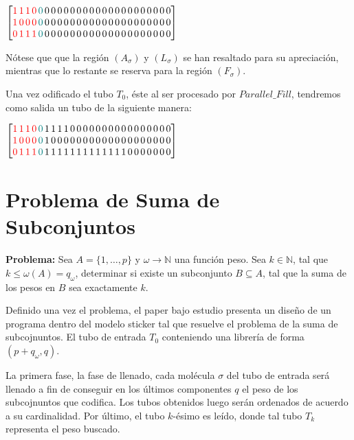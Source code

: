 \documentclass[12pt, letterpaper, twoside]{article}
\begin{document}
        $
            \begin{bmatrix}
                \textcolor{red}{1\,1\,1\,0}\textcolor{teal}{\,0}\,0\,0\,0\,0\,0\,0\,0\,0\,0\,0\,0\,0\,0\,0\,0\,0\,0\,0\,0\,0\\
                \textcolor{red}{1\,0\,0\,0}\textcolor{teal}{\,0}\,0\,0\,0\,0\,0\,0\,0\,0\,0\,0\,0\,0\,0\,0\,0\,0\,0\,0\,0\,0 \\
                \textcolor{red}{0\,1\,1\,1}\textcolor{teal}{\,0}\,0\,0\,0\,0\,0\,0\,0\,0\,0\,0\,0\,0\,0\,0\,0\,0\,0\,0\,0\,0
            \end{bmatrix}
        $


Nótese que que la región $(A_\sigma)$ y $(L_\sigma)$ se han resaltado para su apreciación, mientras que lo restante se reserva para la región $(F_\sigma)$.


Una vez odificado el tubo $T_0$, éste al ser procesado por $Parallel\_Fill$, tendremos como salida un tubo de la siguiente manera:


    $
        \begin{bmatrix}
            \textcolor{red}{1\,1\,1\,0}\textcolor{teal}{\,0}\,1\,1\,1\,1\,0\,0\,0\,0\,0\,0\,0\,0\,0\,0\,0\,0\,0\,0\,0\,0\\
            \textcolor{red}{1\,0\,0\,0}\textcolor{teal}{\,0}\,1\,0\,0\,0\,0\,0\,0\,0\,0\,0\,0\,0\,0\,0\,0\,0\,0\,0\,0\,0 \\
            \textcolor{red}{0\,1\,1\,1}\textcolor{teal}{\,0}\,1\,1\,1\,1\,1\,1\,1\,1\,1\,1\,1\,1\,1\,0\,0\,0\,0\,0\,0\,0
        \end{bmatrix}
    $


    \newpage
    \section{Problema de Suma de Subconjuntos}
    \textbf{Problema:} Sea $A=\{1,\dots,p\}$ y $\omega\rightarrow\mathbb{N}$ una función peso. Sea $k\in\mathbb{N}$, tal que $k\leq\omega(A)=q_\omega$, determinar si existe un subconjunto $B\subseteq A$, tal que la suma de los pesos en $B$ sea exactamente $k$.


    Definido una vez el problema, el paper bajo estudio presenta un diseño de un programa dentro del modelo sticker tal que resuelve el problema de la suma de subcojnuntos. El tubo de entrada $T_0$ conteniendo una librería de forma $(p+q_\omega, q)$. 


    La primera fase, la fase de llenado, cada molécula $\sigma$ del tubo de entrada será llenado a fin de conseguir en los últimos componentes $q$ el peso de los subcojnuntos que codifica. Los tubos obtenidos luego serán ordenados de acuerdo a su cardinalidad. Por último, el tubo $k$-ésimo es leído, donde tal tubo $T_k$ representa el peso buscado.
\end{document}
